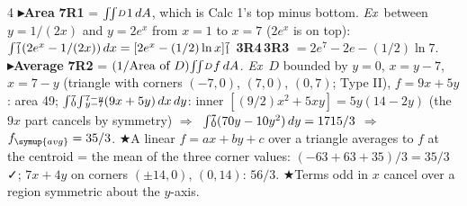 \documentclass{article}
\newcommand\subx[1]{\sb{\smash{\raise0.20em\hbox{$\scriptstyle#1$}}}}    %
\newcommand\supy[1]{\sp{\smash{\lower0.02em\hbox{$\scriptstyle#1$}}}}    %
\newcommand\suby[1]{\sb{\smash{\raise0.10em\hbox{$\scriptstyle#1$}}}}    %
\newcommand\I[2]{{\smash{\int}}\suby{#1}\supy{#2}}                        %
\newcommand\II[1]{{\smash{\iint}}\subx{#1}}                               %
\newcommand\ev[2]{\suby{#1}\supy{#2}}                                     %
\newcommand\sh[1]{{\setlength\fboxsep{0.18pt}\colorbox{black!22}{\textbf{#1}}}}  %
\newcommand\pt[1]{\textbf{{\symf ▸}#1}}       %
\newcommand\ex{\textit{Ex}\ }                  %
\newcommand\shc{{\symf ★}}                      %
\newcommand\ok{{\symf ✓}}                       %
\newcommand\then{\ensuremath{\Rightarrow}}
\newcommand\av{\symup{avg}}
\begin{document}
\begin{multicols*}{4}
\pt{Area} \sh{7R1} = $\II{D}1\,dA$, which is Calc 1's top minus bottom. \ex between $y=1/(2x)$ and $y=2e^x$ from $x=1$ to $x=7$ ($2e^x$ is on top): $\I{1}{7}(2e^x-1/(2x))\,dx=[2e^x-(1/2)\ln x]\ev{1}{7}$ \sh{3R4}\,\sh{3R3} $=2e^7-2e-(1/2)\ln7$.
\pt{Average} \sh{7R2} = $(1/\text{Area of }D)\II{D}f\,dA$. \ex $D$ bounded by $y=0$, $x=y-7$, $x=7-y$ (triangle with corners $(-7,0)$, $(7,0)$, $(0,7)$; Type II), $f=9x+5y$: area 49; $\I{0}{7}\I{y-7}{7-y}(9x+5y)\,dx\,dy$: inner $[(9/2)x^2+5xy]=5y(14-2y)$ (the $9x$ part cancels by symmetry) \then\ $\I{0}{7}(70y-10y^2)\,dy=1715/3$ \then\ $f_\av=35/3$. \shc A linear $f=ax+by+c$ over a triangle averages to $f$ at the centroid = the mean of the three corner values: $(-63+63+35)/3=35/3$ \ok; $7x+4y$ on corners $(\pm14,0)$, $(0,14)$: $56/3$. \shc Terms odd in $x$ cancel over a region symmetric about the $y$-axis.


\end{multicols*}
\end{document}
